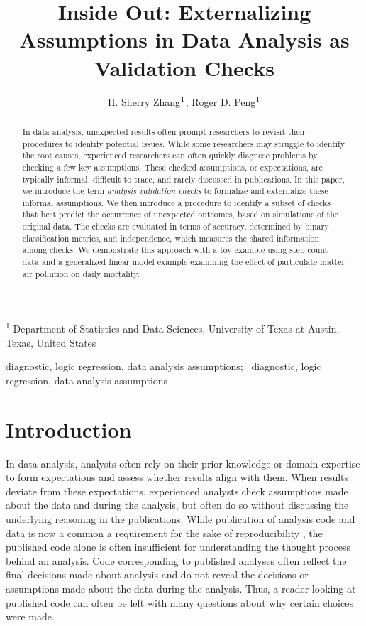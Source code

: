 \documentclass[
  12pt,
]{interact}
\title{Inside Out: Externalizing Assumptions in Data Analysis as
Validation Checks}
\author{H. Sherry Zhang$\textsuperscript{1}$, Roger D.
Peng$\textsuperscript{1}$}
\begin{document}
\captionsetup{labelsep=space}
\maketitle
\textsuperscript{1} Department of Statistics and Data
Sciences, University of Texas at Austin, Texas, United States
\begin{abstract}
In data analysis, unexpected results often prompt researchers to revisit
their procedures to identify potential issues. While some researchers
may struggle to identify the root causes, experienced researchers can
often quickly diagnose problems by checking a few key assumptions. These
checked assumptions, or expectations, are typically informal, difficult
to trace, and rarely discussed in publications. In this paper, we
introduce the term \emph{analysis validation checks} to formalize and
externalize these informal assumptions. We then introduce a procedure to
identify a subset of checks that best predict the occurrence of
unexpected outcomes, based on simulations of the original data. The
checks are evaluated in terms of accuracy, determined by binary
classification metrics, and independence, which measures the shared
information among checks. We demonstrate this approach with a toy
example using step count data and a generalized linear model example
examining the effect of particulate matter air pollution on daily
mortality.
\end{abstract}
\begin{keywords}
\def\sep{;\ }
diagnostic, logic regression, data analysis assumptions\sep 
diagnostic, logic regression, data analysis assumptions
\end{keywords}


\section{Introduction}\label{introduction}

In data analysis, analysts often rely on their prior knowledge or domain
expertise to form expectations and assess whether results align with
them. When results deviate from these expectations, experienced analysts
check assumptions made about the data and during the analysis, but often
do so without discussing the underlying reasoning in the publications.
While publication of analysis code and data is now a common a
requirement for the sake of reproducibility
\citep{peng2011reproducible}, the published code alone is often
insufficient for understanding the thought process behind an analysis.
Code corresponding to published analyses often reflect the final
decisions made about analysis and do not reveal the decisions or
assumptions made about the data during the analysis. Thus, a reader
looking at published code can often be left with many questions about
why certain choices were made.
\end{document}

